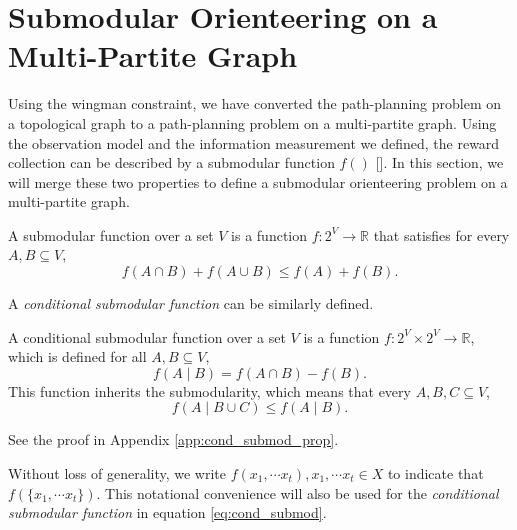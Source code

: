 \documentclass[12pt]{article}
\begin{document}
\section{Submodular Orienteering on a Multi-Partite Graph}
\label{sec:path_dependent_optimization}

Using the wingman constraint, we have converted the path-planning problem on a topological graph to a path-planning problem on a multi-partite graph.
Using the observation model and the information measurement we defined, the reward collection can be described by a submodular function $ f() $ [\cite{goodrich2013toward}].
In this section, we will merge these two properties to define a submodular orienteering problem on a multi-partite graph.


\begin{mydef}
\label{def:submod_func}
A submodular function over a set $ V $ is a function  $ f : 2^{V} \rightarrow \mathbb{R} $ that satisfies for every $ A, B \subseteq V $,
\begin{equation}
\label{eq:submod}
f(A \cap B) + f(A \cup B) \leq f(A) + f(B).
\end{equation}
\end{mydef}

A \emph{conditional submodular function} can be similarly defined.

\begin{mydef}
\label{def:cond_submod_func}
A conditional submodular function over a set $ V $ is a function $ f : 2^{V} \times 2^{V} \rightarrow \mathbb{R} $, which is defined for all $ A, B \subseteq V $, 
\begin{equation}
\label{eq:cond_submod}
f( A \mid B ) = f( A \cap B ) - f( B ).
\end{equation}
This function inherits the submodularity, which means that every $ A, B, C \subseteq V $,
\begin{equation}
\label{eq:cond_submod_prop}
f(A \mid B \cup C) \leq f(A \mid B).
\end{equation}

See the proof in Appendix \ref{app:cond_submod_prop}.

\end{mydef}

Without loss of generality, we write $ f( x_{1} , \cdots x_{t} ), x_{1} , \cdots x_{t} \in X $ to indicate that $ f( \{ x_{1} , \cdots x_{t} \}) $.
This notational convenience will also be used for the \emph{conditional submodular function} in equation \eqref{eq:cond_submod}.
\end{document}
